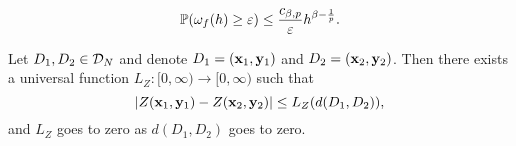 \documentclass[12pt]{report}
\begin{document}
\begin{proposition}
    \begin{equation}
        \mathbb{P}(\omega_f(h) \ge \varepsilon) \le \frac{c_{\beta, p}}{\varepsilon} h^{\beta - \frac{1}{p}}.
    \end{equation}
\end{proposition}

\begin{proposition} \label{prop:Lipschitzness_Z}
    Let $D_1, D_2 \in \mathcal{D}_N$ and denote $D_1 = (\mathbf{x}_1, \mathbf{y}_1)$ and $D_2 = (\mathbf{x}_2, \mathbf{y}_2)$.
    Then there exists a universal function $L_Z\colon[0,\infty)\to[0,\infty)$ such that
    \begin{equation}
        \lvert Z(\mathbf{x}_1, \mathbf{y}_1) - Z(\mathbf{x}_2, \mathbf{y}_2)\rvert
        \le L_Z(d(D_1, D_2)),
    \end{equation}
    and $L_Z$ goes to zero as $d(D_1, D_2)$ goes to zero.
\end{proposition}
\end{document}

